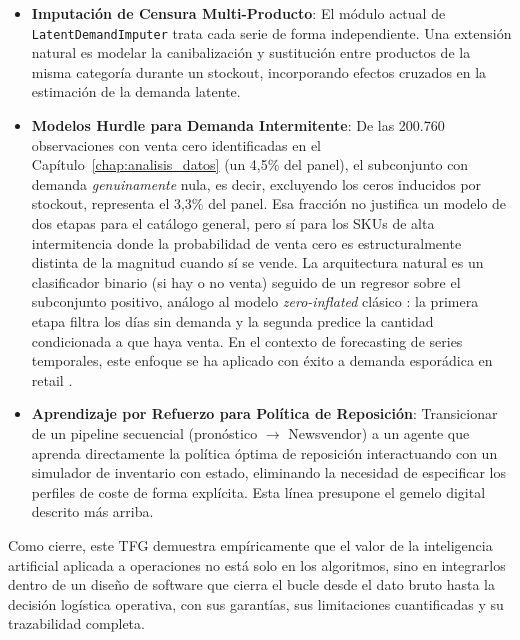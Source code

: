 \begin{itemize}
    \item \textbf{Imputación de Censura Multi-Producto}: El módulo actual de \texttt{Latent}\allowbreak\texttt{Demand}\allowbreak\texttt{Imputer}
    trata cada serie de forma independiente. Una extensión natural es modelar la canibalización y
    sustitución entre productos de la misma categoría durante un stockout, incorporando efectos
    cruzados en la estimación de la demanda latente.

    \item \textbf{Modelos Hurdle para Demanda Intermitente}: De las 200.760 observaciones con venta
    cero identificadas en el Capítulo~\ref{chap:analisis_datos} (un 4{,}5\% del panel), el subconjunto
    con demanda \emph{genuinamente} nula, es decir, excluyendo los ceros inducidos por stockout,
    representa el 3{,}3\% del panel. Esa fracción no justifica
    un modelo de dos etapas para el catálogo general, pero sí para los SKUs de alta intermitencia
    donde la probabilidad de venta cero es estructuralmente distinta de la magnitud cuando sí se
    vende. La arquitectura natural es un clasificador binario (si hay o no venta) seguido de un regresor
    sobre el subconjunto positivo, análogo al modelo \textit{zero-inflated} clásico
    \cite{lambert1992zero}: la primera etapa filtra los días sin demanda y la segunda predice la
    cantidad condicionada a que haya venta. En el contexto de forecasting de series temporales,
    este enfoque se ha aplicado con éxito a demanda esporádica en retail \cite{syntetos2005accuracy}.

    \item \textbf{Aprendizaje por Refuerzo para Política de Reposición}: Transicionar de un
    pipeline secuencial (pronóstico $\rightarrow$ Newsvendor) a un agente que aprenda
    directamente la política óptima de reposición interactuando con un simulador de inventario con
    estado, eliminando la necesidad de especificar los perfiles de coste de forma explícita. Esta
    línea presupone el gemelo digital descrito más arriba.
\end{itemize}

Como cierre, este TFG demuestra empíricamente que el valor de la inteligencia artificial aplicada a operaciones no está solo en los algoritmos, sino en integrarlos dentro de un diseño de software que cierra el bucle desde el dato bruto hasta la decisión logística operativa, con sus garantías, sus limitaciones cuantificadas y su trazabilidad completa.
